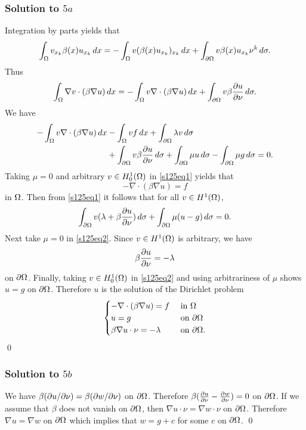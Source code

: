 \subsubsection*{Solution to $5a$}
Integration by parts yields that
\begin{align*}
\int_{\Omega}v_{x_{k}}\beta(x)u_{x_{k}}\, dx = -\int_{\Omega}v(\beta(x)u_{x_{k}})_{x_{k}}\, dx + \int_{\partial\Omega}v\beta(x)u_{x_{k}}\nu^{k}\, d\sigma.
\end{align*}
Thus
\begin{align*}
\int_{\Omega}\nabla v\cdot (\beta\nabla u)\, dx = -\int_{\Omega}v\nabla \cdot (\beta\nabla u)\, dx + \int_{\partial\Omega}v\beta\frac{\partial u}{\partial \nu}\, d\sigma.
\end{align*}
We have
\begin{equation}
\begin{aligned}\label{s125eq1}
-\int_{\Omega}v\nabla \cdot (\beta \nabla u)\, dx &- \int_{\Omega}vf \, dx+ \int_{\partial\Omega}\lambda v\, d\sigma\\
&+ \int_{\partial\Omega}v\beta \frac{\partial u}{\partial \nu}\, d\sigma + \int_{\partial\Omega}\mu u \, d\sigma- \int_{\partial \Omega}\mu g\, d\sigma  = 0.
\end{aligned}
\end{equation}
Taking $\mu = 0$ and arbitrary $v \in H_{0}^{1}(\Omega)$ in \eqref{s125eq1} yields that
$$-\nabla \cdot (\beta \nabla u) = f$$ in $\Omega$. Then from \eqref{s125eq1} it follows that for all $v \in H^{1}(\Omega)$,
\begin{align}\label{s125eq2}
\int_{\partial\Omega}v(\lambda + \beta \frac{\partial u}{\partial \nu})\, d\sigma + \int_{\partial\Omega}\mu(u - g)\, d\sigma = 0.
\end{align}
Next take $\mu = 0$ in \eqref{s125eq2}. Since $v \in H^{1}(\Omega)$ is arbitrary, we have
$$\beta \frac{\partial u}{\partial\nu} = -\lambda$$ on $\partial\Omega$. Finally, taking $v \in H_{0}^{1}(\Omega)$ in \eqref{s125eq2} and using arbitrariness
of $\mu$ shows $u = g$ on $\partial\Omega$. Therefore $u$ is the solution of the Dirichlet problem
\begin{align*}
\begin{cases}
-\nabla \cdot (\beta\nabla u) = f & \text{ in } \Omega\\
u = g & \text{ on }\partial\Omega\\
\beta\nabla u \cdot \nu =-\lambda & \text{ on } \partial\Omega.
\end{cases}
\end{align*}
\hfill\qed

\subsubsection*{Solution to $5b$}
We have $\beta(\partial u/\partial\nu) = \beta(\partial w/\partial \nu)$ on $\partial\Omega$. Therefore $\beta(\frac{\partial u}{\partial \nu} - \frac{\partial w}{\partial\nu}) = 0$
on $\partial\Omega$. If we assume that $\beta$ does not vanish on $\partial\Omega$, then $\nabla u \cdot \nu = \nabla w \cdot \nu$ on $\partial\Omega$.
Therefore $\nabla u = \nabla w$ on $\partial\Omega$ which implies that $w = g + c$ for some $c$ on $\partial\Omega$.
\hfill\qed

